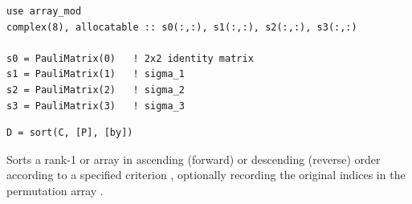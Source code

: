 \begin{description}[leftmargin=2.2cm, style=nextline]
\end{description}

\lstset{language=[95]Fortran}
\begin{lstlisting}
use array_mod
complex(8), allocatable :: s0(:,:), s1(:,:), s2(:,:), s3(:,:)

s0 = PauliMatrix(0)   ! 2x2 identity matrix
s1 = PauliMatrix(1)   ! sigma_1
s2 = PauliMatrix(2)   ! sigma_2
s3 = PauliMatrix(3)   ! sigma_3
\end{lstlisting}


\lstset{language=[95]Fortran}
\begin{lstlisting}
D = sort(C, [P], [by])
\end{lstlisting}

Sorts a rank-1  or  array  in ascending (forward) or descending (reverse) order according to a specified criterion , optionally recording the original indices in the permutation array .

